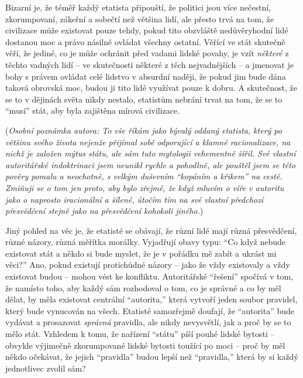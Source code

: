 \documentclass{book}
\begin{document}
Bizarní je, že téměř každý etatista připouští, že politici jsou více nečestní, zkorumpovaní, zákeřní a sobečtí než většina lidí, ale přesto trvá na tom, že civilizace může existovat pouze tehdy, pokud tito obzvláště nedůvěryhodní lidé dostanou moc a právo násilně ovládat všechny ostatní. Věřící ve stát skutečně věří, že jediné, co je může ochránit před vadami lidské povahy, je vzít \emph{některé} z těchto vadných lidí -- ve skutečnosti některé z těch nejvadnějších -- a jmenovat je bohy s právem ovládat celé lidstvo v absurdní naději, že pokud jim bude dána taková obrovská moc, budou ji tito lidé využívat pouze k dobru. A skutečnost, že se to v dějinách světa nikdy nestalo, etatistům nebrání trvat na tom, že se to \enquote{musí} stát, aby byla zajištěna mírová civilizace.

(\emph{Osobní poznámka autora: To vše říkám jako bývalý oddaný etatista, který po většinu svého života nejenže přijímal sobě odporující a klamné racionalizace, na nichž je založen mýtus státu, ale sám tuto mytologii vehementně šířil. Své vlastní autoritářské indoktrinaci jsem neunikl rychle a pohodlně, ale pouštěl jsem se této pověry pomalu a neochotně, s velkým duševním \enquote{kopáním a křikem} na cestě. Zmiňuji se o tom jen proto, aby bylo zřejmé, že když mluvím o víře v autoritu jako o naprosto iracionální a šílené, útočím tím na své vlastní předchozí přesvědčení stejně jako na přesvědčení kohokoli jiného.})

Jiný pohled na věc je, že etatisté se obávají, že různí lidé mají různá přesvědčení, různé názory, různá měřítka morálky. Vyjadřují obavy typu: \enquote{Co když nebude existovat stát a někdo si bude myslet, že je v pořádku mě zabít a ukrást mi věci?} Ano, pokud existují protichůdné názory -- jako že vždy existovaly a vždy existovat budou -- mohou vést ke konfliktu. Autoritářské \enquote{řešení} spočívá v tom, že namísto toho, aby každý sám rozhodoval o tom, co je správné a co by měl dělat, by měla existovat centrální \enquote{autorita,} která vytvoří jeden soubor pravidel, který bude vynucován na všech. Etatisté samozřejmě doufají, že \enquote{autorita} bude vydávat a prosazovat \emph{správná} pravidla, ale nikdy nevysvětlí, jak a proč by se to mělo stát. Vzhledem k tomu, že nařízení \enquote{státu} píší pouhé lidské bytosti -- obvykle výjimečně zkorumpované lidské bytosti toužící po moci -- proč by měl někdo očekávat, že jejich \enquote{pravidla} budou lepší než \enquote{pravidla,} která by si každý jednotlivec zvolil sám?
\end{document}
